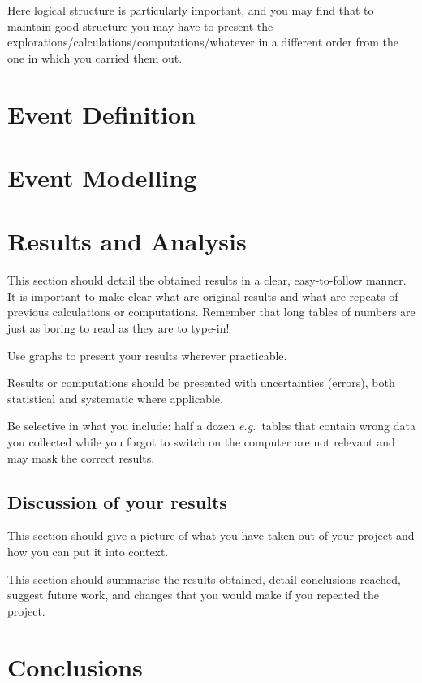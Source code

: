 \documentclass[12pt,a4paper]{report}
\begin{document}
Here logical structure is particularly important, and you may find
that to maintain good structure you may have to present the
explorations/calculations/computations/whatever in a different order
from the one in which you carried them out.

\chapter{Event Definition}\label{ch:def}

\chapter{Event Modelling}\label{ch:model}

\chapter{Results and Analysis}\label{ch:results}

This section should detail the obtained results in a clear,
easy-to-follow manner. It is important to make clear what are original
results and what are repeats of previous calculations or computations.
Remember that long tables of numbers are just as boring to read as
they are to type-in!

Use graphs to present your results wherever practicable.

Results or computations should be presented with uncertainties
(errors), both statistical and systematic where applicable.

Be selective in what you include: half a dozen \emph{e.g.}~tables that
contain wrong data you collected while you forgot to switch on the
computer are not relevant and may mask the correct results.

\section{Discussion of your results}\label{sec:discussion}

This section should give a picture of what you have taken out of your
project and how you can put it into context.

This section should summarise the results obtained, detail conclusions
reached, suggest future work, and changes that you would make if you
repeated the project.

\chapter{Conclusions}\label{ch:conclusions}
\end{document}

